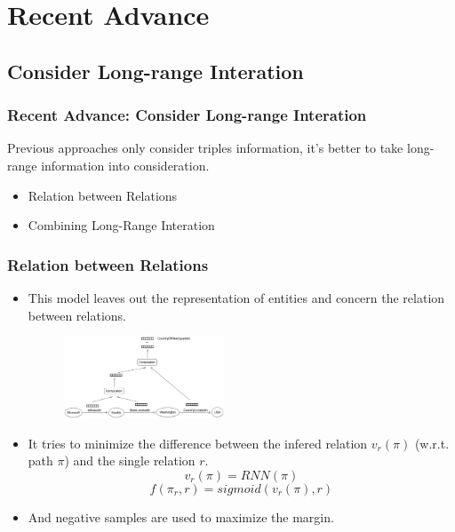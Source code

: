 \documentclass[pdf,10pt]{beamer}
\begin{document}
\section{Recent Advance}

\subsection{Consider Long-range Interation}
\begin{frame}
\frametitle{Recent Advance: Consider Long-range Interation}
	Previous approaches only consider triples information, it's better to take long-range information into consideration.
	\begin{itemize}
		\item Relation between Relations \citep{bowman2014recursive}
		\item Combining Long-Range Interation \citep{wu2015structured}
	\end{itemize}
\end{frame}

\begin{frame}
\frametitle{Relation between Relations \citep{bowman2014recursive}}
\begin{itemize}
	\item This model leaves out the representation of entities and concern the relation between relations.
		\begin{figure}
			\includegraphics[width=0.45\textwidth]{8.eps}
		\end{figure}
	\item It tries to minimize the difference between the infered relation $v_r(\pi)$ (w.r.t. path $\pi$) and the single relation $r$.
		$$v_r(\pi)=RNN(\pi)$$
		$$f(\pi_r,r) = sigmoid(v_r(\pi), r)$$
	\item And negative samples are used to maximize the margin.
\end{itemize}
\end{frame}
\end{document}
